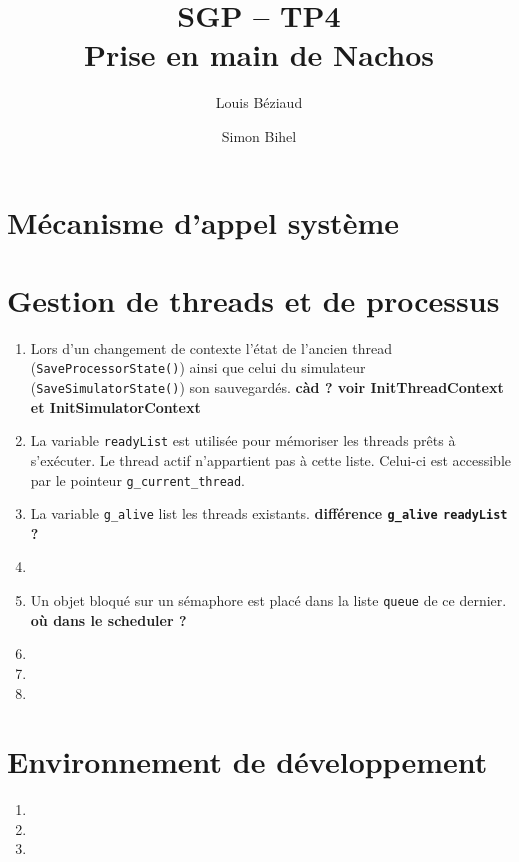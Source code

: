 \documentclass{article}
\title{SGP -- TP4\\Prise en main de Nachos}
\author{Louis Béziaud \and Simon Bihel}
\begin{document}
\maketitle

\section{Mécanisme d'appel système}

\section{Gestion de threads et de processus}

\begin{enumerate}
\item Lors d'un changement de contexte l'état de l'ancien thread ({\tt SaveProcessorState()}) ainsi que celui du simulateur ({\tt SaveSimulatorState()}) son sauvegardés. {\bf càd ? voir InitThreadContext et InitSimulatorContext}
\item La variable {\tt readyList} est utilisée pour mémoriser les threads prêts à s'exécuter. Le thread actif n'appartient pas à cette liste. Celui-ci est accessible par le pointeur {\tt g\_current\_thread}.
\item La variable {\tt g\_alive} list les threads existants. {\bf différence {\tt g\_alive} {\tt readyList} ?}
\item 
\item Un objet bloqué sur un sémaphore est placé dans la liste {\tt queue} de ce dernier. {\bf où dans le scheduler ?}
\item 
\item
\item
\end{enumerate}

\section{Environnement de développement}

\begin{enumerate}
\item
\item
\item
\end{enumerate}
\end{document}
